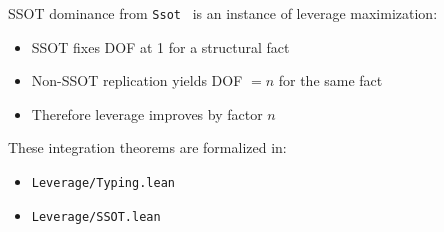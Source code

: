 \begin{theorem}\label{thm:paper2-integration}
SSOT dominance from \texttt{Ssot}~\cite{paper2_ssot} is an instance of leverage maximization:
\begin{itemize}
\item SSOT fixes DOF at 1 for a structural fact
\item Non-SSOT replication yields DOF $= n$ for the same fact
\item Therefore leverage improves by factor $n$
\end{itemize}
\end{theorem}

These integration theorems are formalized in:
\begin{itemize}
\item \nolinkurl{Leverage/Typing.lean}
\item \nolinkurl{Leverage/SSOT.lean}
\end{itemize}
